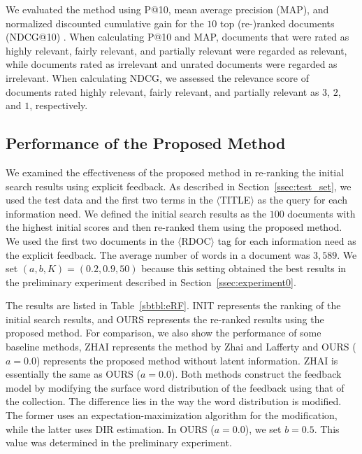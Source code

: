 \documentclass[english]{jnlp_1.4_rep}
\begin{document}
We evaluated the method using P@10, mean average precision (MAP), and
normalized 
\linebreak
discounted cumulative gain for the $10$ top (re-)ranked
documents (NDCG@10) \cite{Jarvelin2002}. When calculating P@10 and MAP,
documents that were rated as highly relevant, fairly relevant, and
partially relevant were regarded as relevant, while documents rated as
irrelevant and unrated documents were regarded as irrelevant. When
calculating NDCG, we assessed the relevance score of documents rated
highly relevant, fairly relevant, and partially relevant as $3$, $2$,
and $1$, respectively.


\subsection{Performance of the Proposed Method}
\label{ssec:experiment1}

We examined the effectiveness of the proposed method in re-ranking the
initial search results using explicit feedback. As described in
Section~\ref{ssec:test_set}, we used the test data and the first two
terms in the $\langle$TITLE$\rangle$ as the query for each information
need. We defined the initial search results as the $100$ documents with
the highest initial scores and then re-ranked them using the proposed
method. We used the first two documents in the $\langle$RDOC$\rangle$
tag for each information need as the explicit feedback. The average
number of words in a document was $3,589$. We set $(a, b, K) = (0.2,
0.9, 50)$ because this setting obtained the best results in the
preliminary experiment described in Section~\ref{ssec:experiment0}.

The results are listed in Table~\ref{sbtbl:eRF}. INIT represents the
ranking of the initial search results, and OURS represents the re-ranked
results using the proposed method. For comparison, we also show the
performance of some baseline methods, ZHAI represents the method by Zhai
and Lafferty \citeyear{Zhai2001} and OURS ($a = 0.0$) represents the
proposed method without latent information. ZHAI is essentially the same
as OURS ($a = 0.0$). Both methods construct the feedback model by
modifying the surface word distribution of the feedback using that of
the collection. The difference lies in the way the word distribution is
modified. The former uses an expectation-maximization algorithm for the
modification, while the latter uses DIR estimation. In OURS ($a = 0.0$),
we set $b = 0.5$. This value was determined in the preliminary
experiment.
\end{document}
